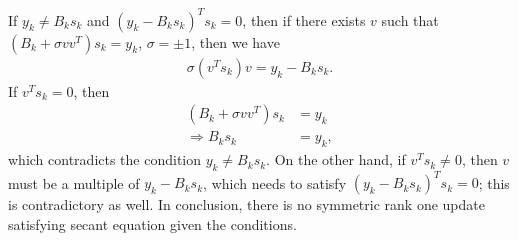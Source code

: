 \documentclass[11pt]{article}
\begin{document}
\section{}
If $y_k \neq B_ks_k$ and $(y_k-B_ks_k)^Ts_k=0$, then if there exists $v$ such that $(B_k+\sigma vv^T)s_k = y_k$, $\sigma=\pm1$, then we have
\begin{equation}\begin{split} 
\sigma(v^Ts_k)v = y_k-B_ks_k.
\end{split}\nonumber\end{equation} 
If $v^Ts_k=0$, then
\begin{equation}\begin{split}
(B_k+\sigma vv^T)s_k &= y_k \\
\Rightarrow B_ks_k &= y_k,
\end{split}\nonumber\end{equation} 
which contradicts the condition $y_k \neq B_ks_k$. On the other hand, if $v^Ts_k\neq0$, then $v$ must be a multiple of $y_k-B_ks_k$, which needs to satisfy $(y_k-B_ks_k)^Ts_k=0$; this is contradictory as well. In conclusion, there is no symmetric rank one update satisfying secant equation given the conditions.
\end{document}
